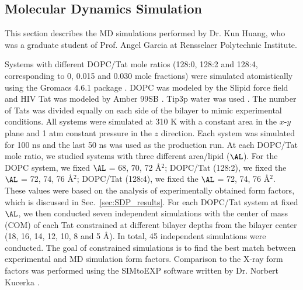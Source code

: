 \subsection{Molecular Dynamics Simulation}\label{sec:sim_methods}
This section describes the MD simulations performed by Dr. Kun Huang, who was
a graduate student of Prof. Angel Garcia at Rensselaer Polytechnic Institute.

Systems with different DOPC/Tat mole ratios (128:0, 128:2 and 128:4, corresponding to
0, 0.015 and 0.030 mole fractions) were simulated atomistically using the Gromacs 4.6.1
package \cite{Hess08}. 
DOPC was modeled by the Slipid force field 
\cite{Jambeck12_JPCB,Jambeck12_JCTC} 
and HIV Tat was modeled by Amber 99SB \cite{Hornak06}. 
Tip3p water was used \cite{Jorgensen83}. The number of Tats was divided equally on
each side of the bilayer to mimic experimental conditions. All systems were simulated at 310 K
with a constant area in the $x$-$y$ plane and 1 atm constant pressure in the $z$ direction. Each
system was simulated for 100 ns and the last 50 ns was used as the production run.
At each DOPC/Tat mole ratio, we studied systems with three different area/lipid ($\AL$).
For the DOPC system, we fixed $\AL$ = 68, 70, 72 \AA$^2$; 
DOPC/Tat (128:2), we fixed the $\AL$ = 72, 74, 76 \AA$^2$; 
DOPC/Tat (128:4), we fixed the $\AL$ = 72, 74, 76 \AA$^2$. 
These values were based on the analysis of experimentally obtained form 
factors, which is discussed in Sec.~\ref{sec:SDP_results}.
For each DOPC/Tat system at fixed $\AL$, 
we then conducted seven independent simulations with the center of mass (COM) of
each Tat constrained at different bilayer depths from the bilayer center 
(18, 16, 14, 12, 10, 8 and 5 \AA). 
In total, 45 independent simulations were conducted. 
The goal of constrained simulations is to find the best match between 
experimental and MD simulation form factors. Comparison to
the X-ray form factors was performed using the SIMtoEXP software 
written by Dr. Norbert Kucerka \cite{Kucerka10}. 


